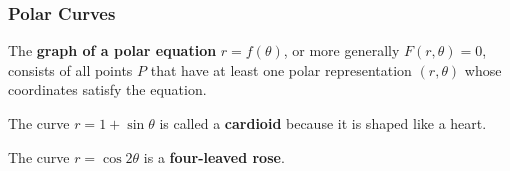 \subsubsection*{Polar Curves}

The \textbf{graph of a polar equation} \(r=f(\theta)\), or more generally
\(F(r,\theta)=0\), consists of all points \(P\) that have at least one polar
representation \((r,\theta)\) whose coordinates satisfy the equation.

The curve \(r=1+\sin\theta\) is called a \textbf{cardioid} because it is
shaped like a heart.

The  curve \(r=\cos 2\theta\) is a \textbf{four-leaved rose}.